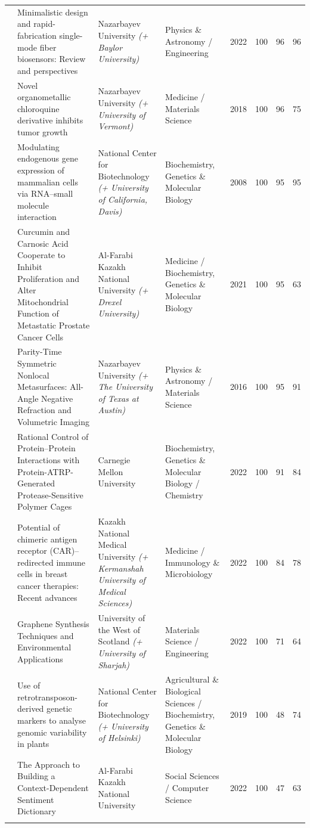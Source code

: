 \documentclass[10pt]{article}
\begin{document}
\begin{longtable}{@{}p{0.4cm} p{4.4cm} p{3.5cm} p{2.5cm} c c c c@{}}
\addlinespace
9 & Minimalistic design and rapid-fabrication single-mode fiber biosensors: Review and perspectives & Nazarbayev University \textit{(+ Baylor University)} & Physics \& Astronomy / Engineering & 2022 & 100 & 96 & 96 \\
\addlinespace
10 & Novel organometallic chloroquine derivative inhibits tumor growth & Nazarbayev University \textit{(+ University of Vermont)} & Medicine / Materials Science & 2018 & 100 & 96 & 75 \\
\addlinespace
11 & Modulating endogenous gene expression of mammalian cells via RNA--small molecule interaction & National Center for Biotechnology \textit{(+ University of California, Davis)} & Biochemistry, Genetics \& Molecular Biology & 2008 & 100 & 95 & 95 \\
\addlinespace
12 & Curcumin and Carnosic Acid Cooperate to Inhibit Proliferation and Alter Mitochondrial Function of Metastatic Prostate Cancer Cells & Al-Farabi Kazakh National University \textit{(+ Drexel University)} & Medicine / Biochemistry, Genetics \& Molecular Biology & 2021 & 100 & 95 & 63 \\
\addlinespace
13 & Parity-Time Symmetric Nonlocal Metasurfaces: All-Angle Negative Refraction and Volumetric Imaging & Nazarbayev University \textit{(+ The University of Texas at Austin)} & Physics \& Astronomy / Materials Science & 2016 & 100 & 95 & 91 \\
\addlinespace
14 & Rational Control of Protein--Protein Interactions with Protein-ATRP-Generated Protease-Sensitive Polymer Cages & Carnegie Mellon University & Biochemistry, Genetics \& Molecular Biology / Chemistry & 2022 & 100 & 91 & 84 \\
\addlinespace
15 & Potential of chimeric antigen receptor (CAR)--redirected immune cells in breast cancer therapies: Recent advances & Kazakh National Medical University \textit{(+ Kermanshah University of Medical Sciences)} & Medicine / Immunology \& Microbiology & 2022 & 100 & 84 & 78 \\
\addlinespace
16 & Graphene Synthesis Techniques and Environmental Applications & University of the West of Scotland \textit{(+ University of Sharjah)} & Materials Science / Engineering & 2022 & 100 & 71 & 64 \\
\addlinespace
17 & Use of retrotransposon-derived genetic markers to analyse genomic variability in plants & National Center for Biotechnology \textit{(+ University of Helsinki)} & Agricultural \& Biological Sciences / Biochemistry, Genetics \& Molecular Biology & 2019 & 100 & 48 & 74 \\
\addlinespace
18 & The Approach to Building a Context-Dependent Sentiment Dictionary & Al-Farabi Kazakh National University & Social Sciences / Computer Science & 2022 & 100 & 47 & 63 \\
\\ \bottomrule
\end{longtable}
\normalsize
\end{document}
